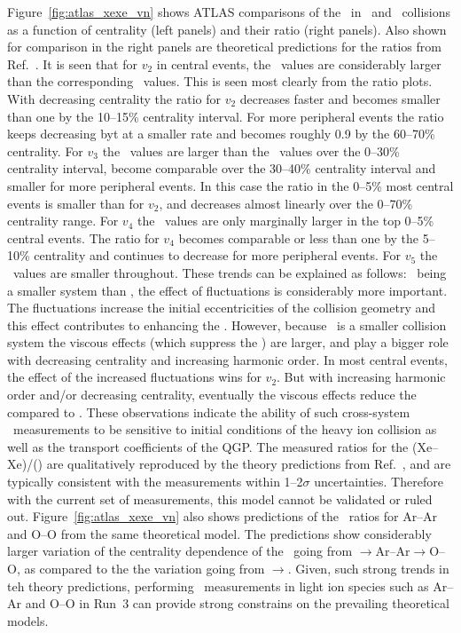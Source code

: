 Figure~\ref{fig:atlas_xexe_vn} shows ATLAS comparisons of the \vn\
  in \xexe\ and \pbpb\ collisions as a function of centrality (left panels)
  and their ratio (right panels).
Also shown for comparison in the right panels are theoretical predictions
  for the ratios from Ref.~\cite{Giacalone:2017dud}.
It is seen that for $v_2$ in central events, the \xexe\ values are
  considerably larger than the corresponding \pbpb\ values.
This is seen most clearly from the ratio plots.
With decreasing centrality the ratio for $v_2$ decreases faster and
  becomes smaller than one by the 10--15\% centrality interval.
For more peripheral events the ratio keeps decreasing byt at a
  smaller rate and becomes roughly 0.9 by the 60--70\% centrality.
For $v_3$ the \xexe\ values are larger than the \pbpb\ values
  over the 0--30\% centrality interval,  become comparable over the
  30--40\% centrality interval and smaller for more peripheral events.
In this case the ratio in the 0--5\% most central events is smaller
  than for $v_2$, and decreases almost linearly over the 0--70\%
  centrality range.
For $v_4$ the \xexe\ values are only marginally larger in the top
  0--5\% central events.
The ratio for $v_4$ becomes comparable or less than one by the
  5--10\% centrality and continues to decrease for
  more peripheral events.
For $v_5$ the \xexe\ values are smaller throughout.
These trends can be explained as follows:
  \xexe\ being a smaller system than \pbpb, the effect of fluctuations
  is considerably more important.
The fluctuations increase the initial eccentricities of the collision
  geometry and this effect contributes to enhancing the \vn.
However, because \xexe\ is a smaller collision system the viscous
  effects (which suppress the \vn) are larger, and play a bigger role
  with decreasing centrality and increasing harmonic order.
In most central events, the effect of the increased fluctuations wins
  for $v_2$.
But with increasing harmonic order and/or decreasing centrality, 
  eventually the viscous effects reduce the \vn compared to \pbpb.
These observations indicate the ability of such cross-system 
  \vn\ measurements to be sensitive to initial conditions of 
  the heavy ion collision as well as the transport coefficients
  of the QGP. 
The measured ratios for the \vn(Xe--Xe)/\vn(\pbpb) are qualitatively reproduced 
  by the theory predictions from Ref.~\cite{Giacalone:2017dud},
	and are typically consistent with the measurements within 1--2$\sigma$
	uncertainties.
Therefore with the current set of measurements, this model cannot be validated
  or ruled out.
Figure~\ref{fig:atlas_xexe_vn} also shows predictions of the \vn\ ratios
  for Ar--Ar and O--O from the same theoretical model.
The predictions show considerably larger variation of the centrality dependence
  of the \vn\ going from \xexe$\rightarrow$Ar--Ar$\rightarrow$O--O, as compared to
	the the variation going from \pbpb$\rightarrow$\xexe.
Given, such strong trends in teh theory predictions, performing \vn\ measurements 
  in light ion species such as Ar--Ar and O--O in Run~3 can provide strong 
  constrains on the prevailing theoretical models.

